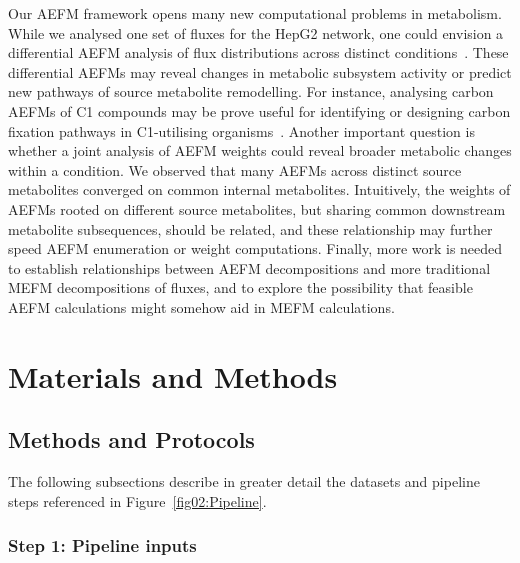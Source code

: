 \documentclass[12pt]{article}
\begin{document}
Our AEFM framework opens many new computational problems in metabolism.
While we analysed one set of fluxes for the HepG2 network, one could
envision a differential AEFM analysis of flux distributions across
distinct
conditions~\citep{GaluzziBrunoG.2024Affd,LiXuhang2025Efpa,RaviSudharshan2021Δmfa}.
These differential AEFMs may reveal changes in metabolic subsystem
activity or predict new pathways of source metabolite remodelling. For
instance, analysing carbon AEFMs of C1 compounds may be prove useful for
identifying or designing carbon fixation pathways in C1-utilising
organisms~\citep{AtaOzge2024Itmw}. Another important question is whether
a joint analysis of AEFM weights could reveal broader metabolic changes
within a condition. We observed that many AEFMs across distinct source
metabolites converged on common internal metabolites. Intuitively, the
weights of AEFMs rooted on different source metabolites, but sharing
common downstream metabolite subsequences, should be related, and these
relationship may further speed AEFM enumeration or weight computations.
Finally, more work is needed to establish relationships between AEFM
decompositions and more traditional MEFM decompositions of fluxes, and to
explore the possibility that feasible AEFM calculations might somehow aid
in MEFM calculations.

\section*{Materials and Methods}



\subsection*{Methods and Protocols}

The following subsections describe in greater detail the datasets and
pipeline steps referenced in Figure~\ref{fig02:Pipeline}.

\subsubsection*{Step 1: Pipeline inputs}
\end{document}
